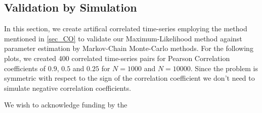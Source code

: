 \documentclass[%
 reprint,
 amsmath,amssymb,
 aps,
]{revtex4-1}
\begin{document}
\subsection{Validation by Simulation}
In this section, we create artifical correlated time-series employing the method mentioned in \ref{sec_CO} to validate our Maximum-Likelihood method against parameter estimation by Markov-Chain Monte-Carlo methods.  For the following plots, we created 400 correlated time-series pairs for Pearson Correlation coefficients of $0.9$, $0.5$ and $0.25$ for $N=1000$ and $N=10000$.  Since the problem is symmetric with respect to the sign of the correlation coefficient we don't need to simulate negative correlation coefficients.

\begin{acknowledgments}
We wish to acknowledge funding by the 
\end{acknowledgments}

\end{document}
